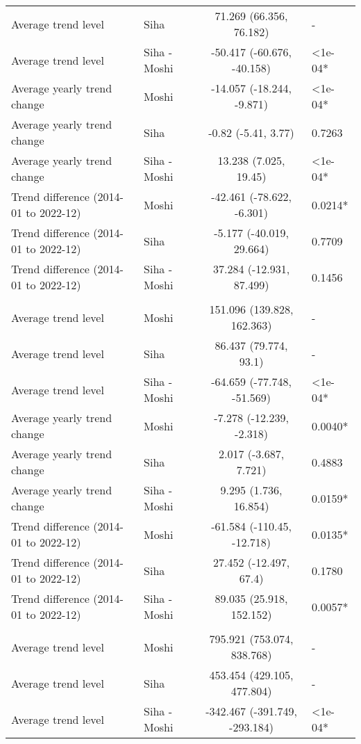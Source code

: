 \begin{longtable}{l|lcl}
Average trend level & Siha & 71.269 (66.356, 76.182) & - \\ 
Average trend level & Siha - Moshi & -50.417 (-60.676, -40.158) & <1e-04* \\ 
Average yearly trend change & Moshi & -14.057 (-18.244, -9.871) & <1e-04* \\ 
Average yearly trend change & Siha & -0.82 (-5.41, 3.77) & 0.7263 \\ 
Average yearly trend change & Siha - Moshi & 13.238 (7.025, 19.45) & <1e-04* \\ 
Trend difference (2014-01 to 2022-12) & Moshi & -42.461 (-78.622, -6.301) & 0.0214* \\ 
Trend difference (2014-01 to 2022-12) & Siha & -5.177 (-40.019, 29.664) & 0.7709 \\ 
Trend difference (2014-01 to 2022-12) & Siha - Moshi & 37.284 (-12.931, 87.499) & 0.1456 \\ 
\midrule\addlinespace[2.5pt]
\multicolumn{4}{l}{Fractures} \\ 
\midrule\addlinespace[2.5pt]
Average trend level & Moshi & 151.096 (139.828, 162.363) & - \\ 
Average trend level & Siha & 86.437 (79.774, 93.1) & - \\ 
Average trend level & Siha - Moshi & -64.659 (-77.748, -51.569) & <1e-04* \\ 
Average yearly trend change & Moshi & -7.278 (-12.239, -2.318) & 0.0040* \\ 
Average yearly trend change & Siha & 2.017 (-3.687, 7.721) & 0.4883 \\ 
Average yearly trend change & Siha - Moshi & 9.295 (1.736, 16.854) & 0.0159* \\ 
Trend difference (2014-01 to 2022-12) & Moshi & -61.584 (-110.45, -12.718) & 0.0135* \\ 
Trend difference (2014-01 to 2022-12) & Siha & 27.452 (-12.497, 67.4) & 0.1780 \\ 
Trend difference (2014-01 to 2022-12) & Siha - Moshi & 89.035 (25.918, 152.152) & 0.0057* \\ 
\midrule\addlinespace[2.5pt]
\multicolumn{4}{l}{Hypertension} \\ 
\midrule\addlinespace[2.5pt]
Average trend level & Moshi & 795.921 (753.074, 838.768) & - \\ 
Average trend level & Siha & 453.454 (429.105, 477.804) & - \\ 
Average trend level & Siha - Moshi & -342.467 (-391.749, -293.184) & <1e-04* \\ 

\end{longtable}
